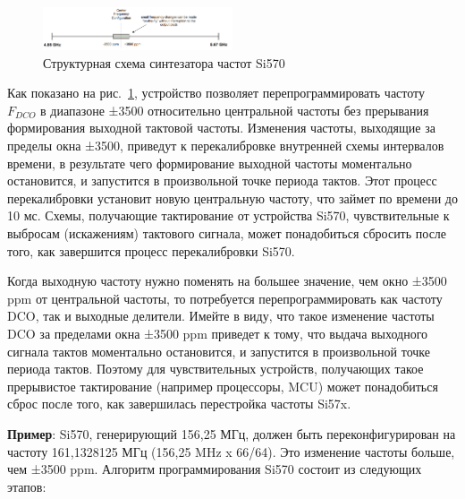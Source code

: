 \documentclass[a4paper,oneside ,14pt]{extreport}
\begin{document}
\begin{figure}[h]
	\centering
	\includegraphics[width=0.5\textwidth]{image/si570_0.png}
	\caption{Структурная схема синтезатора частот Si570}
	\label{si570_0.PNG}
\end{figure}

Как показано на рис.~\ref{si570_0.PNG}, устройство позволяет перепрограммировать частоту \(F_{DCO}\) в диапазоне ±3500 относительно центральной частоты без прерывания формирования выходной тактовой частоты. Изменения частоты, выходящие за пределы окна ±3500, приведут к перекалибровке внутренней схемы интервалов времени, в результате чего формирование выходной частоты моментально остановится, и запустится в произвольной точке периода тактов. Этот процесс перекалибровки установит новую центральную частоту, что займет по времени до 10 мс. Схемы, получающие тактирование от устройства Si570, чувствительные к выбросам (искажениям) тактового сигнала, может понадобиться сбросить после того, как завершится процесс перекалибровки Si570.

Когда выходную частоту нужно поменять на большее значение, чем окно ±3500 ppm от центральной частоты, то потребуется перепрограммировать как частоту DCO, так и выходные делители. Имейте в виду, что такое изменение частоты DCO за пределами окна ±3500 ppm приведет к тому, что выдача выходного сигнала тактов моментально остановится, и запустится в произвольной точке периода тактов. Поэтому для чувствительных устройств, получающих такое прерывистое тактирование (например процессоры, MCU) может понадобиться сброс после того, как завершилась перестройка частоты Si57x.

\textbf{Пример}: Si570, генерирующий 156,25 МГц, должен быть переконфигурирован на частоту 161,1328125 МГц (156,25 MHz x 66/64). Это изменение частоты больше, чем ±3500 ppm. Алгоритм программирования Si570 состоит из следующих этапов:
\end{document}
